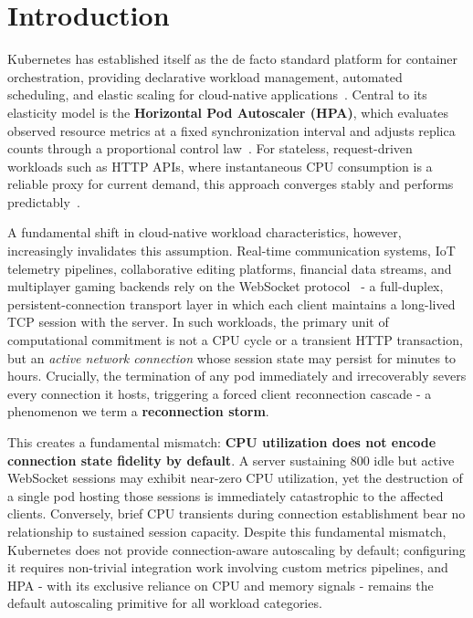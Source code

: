 \documentclass[twocolumn]{svjour3}
\begin{document}
\section{Introduction}
\label{sec:intro}

Kubernetes has established itself as the de facto standard platform for container orchestration, providing declarative workload management, automated scheduling, and elastic scaling for cloud-native applications~\cite{burns2016borg,verma2015large}. Central to its elasticity model is the \textbf{Horizontal Pod Autoscaler (HPA)}, which evaluates observed resource metrics at a fixed synchronization interval and adjusts replica counts through a proportional control law~\cite{k8s_hpa_docs,nguyen2020hpa}. For stateless, request-driven workloads such as HTTP APIs, where instantaneous CPU consumption is a reliable proxy for current demand, this approach converges stably and performs predictably~\cite{casalicchio2019auto,qu2018auto}.

A fundamental shift in cloud-native workload characteristics, however, increasingly invalidates this assumption. Real-time communication systems, IoT telemetry pipelines, collaborative editing platforms, financial data streams, and multiplayer gaming backends rely on the WebSocket protocol~\cite{websocket_rfc} - a full-duplex, persistent-connection transport layer in which each client maintains a long-lived TCP session with the server. In such workloads, the primary unit of computational commitment is not a CPU cycle or a transient HTTP transaction, but an \textit{active network connection} whose session state may persist for minutes to hours. Crucially, the termination of any pod immediately and irrecoverably severs every connection it hosts, triggering a forced client reconnection cascade - a phenomenon we term a \textbf{reconnection storm}.

This creates a fundamental mismatch: \textbf{CPU utilization does not encode connection state fidelity by default}. A server sustaining 800 idle but active WebSocket sessions may exhibit near-zero CPU utilization, yet the destruction of a single pod hosting those sessions is immediately catastrophic to the affected clients. Conversely, brief CPU transients during connection establishment bear no relationship to sustained session capacity. Despite this fundamental mismatch, Kubernetes does not provide connection-aware autoscaling by default; configuring it requires non-trivial integration work involving custom metrics pipelines, and HPA - with its exclusive reliance on CPU and memory signals - remains the default autoscaling primitive for all workload categories.
\end{document}

